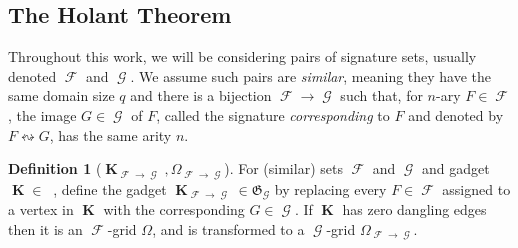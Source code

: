 \documentclass{article}
\theoremstyle{remark}
\theoremstyle{definition}
\newtheorem{definition}{Definition}[section]
\DeclareMathOperator{\vk}{\mathbf{K}}
\DeclareMathOperator{\fc}{\mathcal{F}}
\DeclareMathOperator{\gc}{\mathcal{G}}
\DeclareMathOperator{\gk}{\mathfrak{G}_{\mathcal{F}}}
\begin{document}
\subsection{The Holant Theorem}
\label{sec:holanttheorem}
Throughout this work, we will be considering pairs of signature sets, usually denoted $\fc$
and $\gc$. We assume such pairs are \emph{similar}, meaning they have the same domain size $q$ and
there is a bijection $\fc \to \gc$ such that, for $n$-ary $F \in \fc$, the image $G \in \gc$ of $F$, 
called the signature \emph{corresponding} to $F$ and denoted by $F \leftrightsquigarrow G$, has the same
arity $n$.
\begin{definition}[$\vk_{\fc\to\gc}, \Omega_{\fc\to\gc}$]
    For (similar) sets $\fc$ and $\gc$ and gadget $\vk \in \gk$, define the gadget
    $\vk_{\fc\to\gc} \in \mathfrak{G}_{\gc}$ by replacing every $F \in \fc$ assigned to a vertex in
    $\vk$ with the corresponding $G \in \gc$. If $\vk$ has zero dangling edges then it is an
    $\fc$-grid $\Omega$, and is transformed to a $\gc$-grid $\Omega_{\fc\to\gc}$.
\end{definition}
\end{document}
